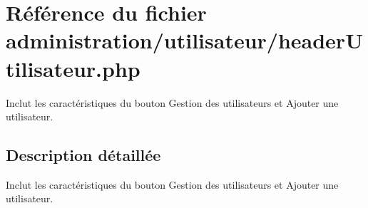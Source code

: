 \hypertarget{headerUtilisateur_8php}{}\section{Référence du fichier administration/utilisateur/header\+Utilisateur.php}
\label{headerUtilisateur_8php}


Inclut les caractéristiques du bouton Gestion des utilisateurs et Ajouter une utilisateur.  




\subsection{Description détaillée}
Inclut les caractéristiques du bouton Gestion des utilisateurs et Ajouter une utilisateur. 

